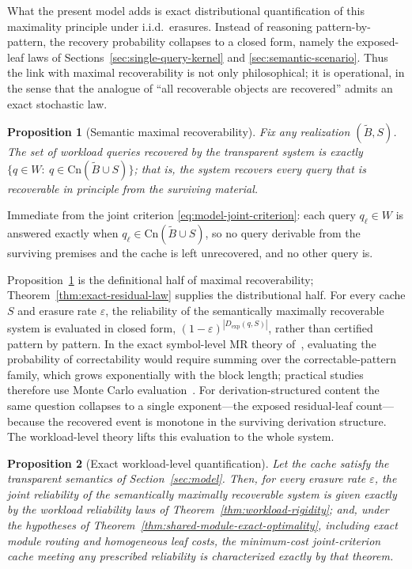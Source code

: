 \documentclass[journal]{IEEEtran}
\makeatletter
\newcommand{\Cn}{\text{Cn}}
\newtheorem{proposition}{Proposition}[section]
\numberwithin{equation}{section}
\renewenvironment{proof}[1][\proofname]{\par
  \pushQED{\qed}%
  \normalfont \topsep6\p@\@plus6\p@\relax
  \trivlist
  \item[\hskip\labelsep
        \itshape
    #1\@addpunct{.}]\ignorespaces
}{%
  \popQED\endtrivlist\@endpefalse
}
\makeatother
\begin{document}
What the present model adds is exact distributional quantification of this
maximality principle under i.i.d.\ erasures.  Instead of reasoning
pattern-by-pattern, the recovery probability collapses to a closed form,
namely the exposed-leaf laws of
Sections~\ref{sec:single-query-kernel} and
\ref{sec:semantic-scenario}.  Thus the link with maximal recoverability is
not only philosophical; it is operational, in the sense that the analogue
of ``all recoverable objects are recovered'' admits an exact stochastic law.

\begin{proposition}[Semantic maximal recoverability]
\label{prop:semantic-mr}
Fix any realization \((\widetilde B,S)\).  The set of workload queries
recovered by the transparent system is exactly
\(\{q\in W:\ q\in\Cn(\widetilde B\cup S)\}\); that is, the system recovers
every query that is recoverable in principle from the surviving material.
\end{proposition}

\begin{proof}
Immediate from the joint criterion \eqref{eq:model-joint-criterion}: each
query \(q_\ell\in W\) is answered exactly when
\(q_\ell\in\Cn(\widetilde B\cup S)\), so no query derivable from the
surviving premises and the cache is left unrecovered, and no other query
is.
\end{proof}

Proposition~\ref{prop:semantic-mr} is the definitional half of maximal
recoverability; Theorem~\ref{thm:exact-residual-law} supplies the
distributional half.  For every cache \(S\) and erasure rate
\(\varepsilon\), the reliability of the semantically maximally recoverable
system is evaluated in closed form,
\((1-\varepsilon)^{|D_{\mathrm{exp}}(q,S)|}\), rather than certified
pattern by pattern.  In the exact symbol-level MR theory
of~\cite{martinez2026maximally}, evaluating the probability of
correctability would require summing over the correctable-pattern family,
which grows exponentially with the block length; practical studies therefore
use Monte Carlo evaluation~\cite{kadekodi2023wide}.  For
derivation-structured content the same question collapses to a single
exponent---the exposed residual-leaf count---because the recovered event is
monotone in the surviving derivation structure.  The workload-level theory
lifts this evaluation to the whole system.

\begin{proposition}[Exact workload-level quantification]
\label{prop:workload-mr-quantification}
Let the cache satisfy the transparent semantics of
Section~\ref{sec:model}.  Then, for every erasure rate \(\varepsilon\),
the joint reliability of the semantically maximally recoverable system is
given exactly by the workload reliability laws of
Theorem~\ref{thm:workload-rigidity}; and, under the hypotheses of
Theorem~\ref{thm:shared-module-exact-optimality}, including exact module
routing and homogeneous leaf costs, the minimum-cost joint-criterion cache
meeting any prescribed reliability is characterized exactly by that
theorem.
\end{proposition}
\end{document}
